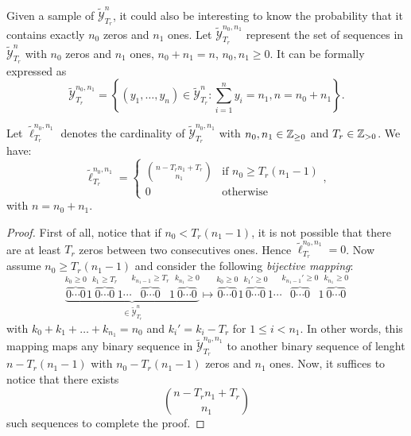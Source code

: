 \documentclass{article}
\begin{document}
    Given a sample of $\tilde{\mathcal{Y}}_{T_r}^{n}$, it could also be interesting to know the probability 
    that it contains exactly $n_0$ zeros and $n_1$ ones. Let $\tilde{\mathcal{Y}}_{T_r}^{n_0, n_1}$ represent
    the set of sequences in $\tilde{\mathcal{Y}}_{T_r}^{n}$ with $n_0$ zeros and $n_1$ ones, $n_0 + n_1 = n$, $n_0, n_1 \geq 0$. 
    It can be formally expressed as
    \begin{equation}
      \tilde{\mathcal{Y}}_{T_r}^{n_0, n_1} = \left\{(y_1, \dots, y_{n}) \in \tilde{\mathcal{Y}}_{T_r}^{n} : \sum_{i=1}^n y_i = n_1, n = n_0 + n_1 \right\}.
    \end{equation}

    \begin{theorem}
      Let $\tilde{\ell}_{T_r}^{n_0,n_1}$ denotes the cardinality of $\tilde{\mathcal{Y}}_{T_r}^{n_0, n_1}$ with $n_0, n_1 \in \mathbb{Z}_{\geq 0}$ and $T_r \in \mathbb{Z}_{> 0}$. We have:
      \begin{equation}
        \tilde{\ell}_{T_r}^{n_0,n_1} = 
        \left\{
          \begin{array}{ll}
            \binom{n - T_r n_1 + T_r}{n_1} & \mbox{if } n_0 \geq T_r(n_1-1) \\
            0 & \mbox{otherwise}
          \end{array}
        \right.,
      \end{equation}
      with $n = n_0 + n_1$.
    \end{theorem}

    \begin{proof}
      First of all, notice that if $n_0 < T_r(n_1 - 1)$, it is not possible that there are at least $T_r$ zeros between two
      consecutives ones. Hence $\tilde{\ell}_{T_r}^{n_0,n_1} = 0$.
      Now assume $n_0 \geq T_r(n_1 - 1)$ and consider the following \emph{bijective mapping}:
      \begin{equation}
        \underbrace{\overbrace{0 \cdots 0}^{k_0 \geq 0} 1 \overbrace{0 \cdots 0}^{k_1 \geq T_r} 1 
        \cdots \overbrace{0 \cdots 0}^{k_{n_1-1}\geq T_r} 
        1 \overbrace{0 \cdots 0}^{k_{n_1} \geq 0}}_{\in \tilde{\mathcal{Y}}^n_{T_r}}
        \mapsto \overbrace{0 \cdots 0}^{k_0 \geq 0} 1 \overbrace{0 \cdots 0}^{k_1' \geq 0} 1 
        \cdots \overbrace{0 \cdots 0}^{k_{n_1-1}' \geq 0} 1 \overbrace{0 \cdots 0}^{k_{n_1} \geq 0} 
      \end{equation}
      with $k_0 + k_1 + \dots + k_{n_1} = n_0$ and $k_i' = k_i - T_r$ for $1 \leq i < n_1$. In other words, this mapping 
      maps any binary sequence in $\tilde{\mathcal{Y}}^{n_0, n_1}_{T_r}$ to another binary sequence of lenght $n - T_r (n_1 - 1)$
      with $n_0 - T_r (n_1 - 1)$ zeros and $n_1$ ones. Now, it suffices to notice that there exists  
      \begin{equation}
        \binom{n - T_r n_1 + T_r}{n_1}
      \end{equation}
      such sequences to complete the proof.
    \end{proof}
\end{document}
